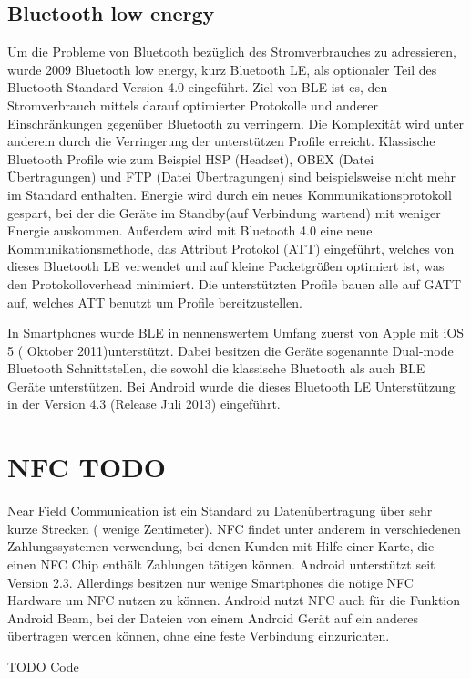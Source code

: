 \documentclass[12pt,journal,compsoc]{IEEEtran}
\begin{document}
\subsection{Bluetooth low energy}
Um die Probleme von Bluetooth bezüglich des Stromverbrauches zu adressieren, wurde 2009 Bluetooth low energy, kurz Bluetooth LE, als optionaler Teil des Bluetooth Standard Version 4.0 eingeführt.  
Ziel von BLE ist es, den Stromverbrauch mittels darauf optimierter Protokolle und anderer Einschränkungen gegenüber Bluetooth zu verringern.
Die Komplexität wird unter anderem durch die Verringerung der unterstützen Profile erreicht. Klassische Bluetooth Profile wie zum Beispiel HSP (Headset), OBEX (Datei Übertragungen) und FTP (Datei Übertragungen) sind beispielsweise nicht mehr im Standard enthalten.
Energie wird durch ein neues Kommunikationsprotokoll gespart, bei der die Geräte im Standby(auf Verbindung wartend) mit weniger Energie auskommen.
Außerdem wird mit Bluetooth 4.0 eine neue Kommunikationsmethode, das Attribut Protokol (ATT) eingeführt, welches von dieses Bluetooth LE verwendet und auf kleine Packetgrößen optimiert ist, was den Protokolloverhead minimiert.
Die unterstützten Profile bauen alle auf GATT auf, welches ATT benutzt um Profile bereitzustellen.


In Smartphones wurde BLE in nennenswertem Umfang zuerst von Apple mit iOS 5 ( Oktober 2011)unterstützt.
Dabei besitzen die Geräte sogenannte Dual-mode Bluetooth Schnittstellen, die sowohl die klassische Bluetooth als auch BLE Geräte unterstützen.
Bei Android wurde die dieses Bluetooth LE Unterstützung in der Version 4.3 (Release Juli 2013) eingeführt.

\section{NFC TODO}
Near Field Communication ist ein Standard zu Datenübertragung über sehr kurze Strecken ( wenige Zentimeter). 
NFC findet unter anderem in verschiedenen Zahlungssystemen verwendung, bei denen Kunden mit Hilfe einer Karte, die einen NFC Chip enthält Zahlungen tätigen können.
Android unterstützt seit Version 2.3. Allerdings besitzen nur wenige Smartphones die nötige NFC Hardware um NFC nutzen zu können.
Android nutzt NFC auch für die Funktion Android Beam, bei der Dateien von einem Android Gerät auf ein anderes übertragen werden können, ohne eine feste Verbindung einzurichten.

TODO Code
\end{document}
